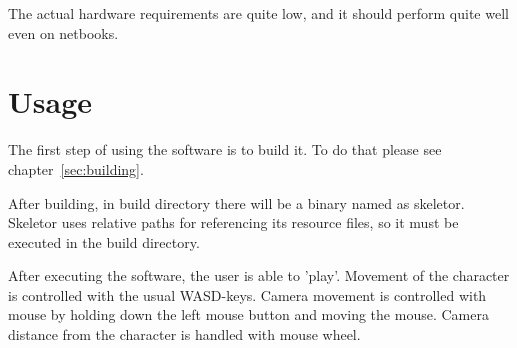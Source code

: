 \documentclass[11pt,twoside,a4paper]{article}
\begin{document}
The actual hardware requirements are quite low, and it should perform quite well even on netbooks.

\section{Usage}
\label{sec:usage}

The first step of using the software is to build it. To do that please see chapter~\ref{sec:building}.

After building, in build directory there will be a binary named as skeletor. Skeletor uses relative paths for referencing its resource files, so it must be executed in the build directory.

After executing the software, the user is able to 'play'. Movement of the character is controlled with the usual WASD-keys. Camera movement is controlled with mouse by holding down the left mouse button and moving the mouse. Camera distance from the character is handled with mouse wheel.
\end{document}
